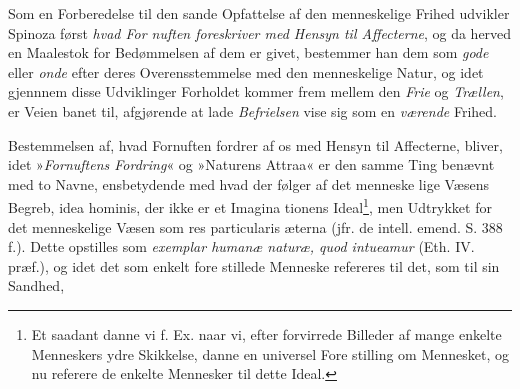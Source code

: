 \documentclass[12pt,a4paper]{book}
\newcommand{\opage}[1]{\marginnote{\footnotesize\textit{[#1]}}}
\begin{document}
Som en Forberedelse til den sande Opfattelse af den
menneskelige Frihed udvikler Spinoza først \emph{hvad For\-%
nuften foreskriver med Hensyn til Affecterne}, og
da herved en Maalestok for Bedømmelsen af dem er givet,
bestemmer han dem som \emph{gode} eller \emph{onde} efter deres
Overensstemmelse med den menneskelige Natur, og idet
gjennnem disse Udviklinger Forholdet kommer frem mellem
den \emph{Frie} og \emph{Trællen}, er Veien banet til, afgjørende at
lade \emph{Befrielsen} vise sig som en \emph{værende} Frihed.

Bestemmelsen af, hvad Fornuften fordrer af os med
Hensyn til Affecterne, bliver, idet »\emph{Fornuftens Fordring}«
og »Naturens Attraa« er den samme Ting benævnt med to
Navne, ensbetydende med hvad der følger af det menneske\-%
lige Væsens Begreb, idea hominis, der ikke er et Imagina\-%
tionens Ideal\footnote{Et saadant danne vi f. Ex. naar vi, efter forvirrede Billeder af
mange enkelte Menneskers ydre Skikkelse, danne en universel Fore\-%
stilling om Mennesket, og nu referere de enkelte Mennesker til
dette Ideal.}, men Udtrykket for det menneskelige Væsen
\opage{123} \setcounter{footnote}{0}%
som res particularis æterna (jfr. de intell. emend. S. 388 f.).
Dette opstilles som \emph{exemplar humanæ naturæ, quod
intueamur} (Eth. IV. præf.), og idet det som enkelt fore\-%
stillede Menneske refereres til det, som til sin Sandhed,
\end{document}
